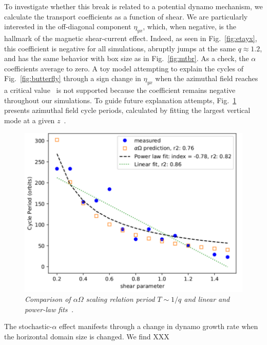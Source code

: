 \documentclass{epsconf}
\begin{document}
To investigate whether this break is related to a potential dynamo mechanism, we calculate the transport coefficients as a function of shear. We are particularly interested in the off-diagonal component $\eta_{yx}$, which, when negative, is the hallmark of the magnetic shear-current effect. Indeed, as seen in Fig.~\ref{fig:etayx}, this coefficient is negative for all simulations, abruptly jumps at the same $q\approx1.2$, and has the same behavior with box size as in Fig.~\ref{fig:mtbr}. As a check, the $\alpha$ coefficients average to zero. A toy model attempting to explain the cycles of Fig.~\ref{fig:butterfly} through a sign change in $\eta_{yx}$ when the azimuthal field reaches a critical value~\cite{LesurOgilvie08} is not supported because the coefficient remains negative throughout our simulations. To guide future explanation attempts, Fig.~\ref{fig:qperiod} presents azimuthal field cycle periods, calculated by fitting the largest vertical mode at a given $z$~\cite{SSH16}. 
\begin{figure}
\begin{center} \vspace{-1cm}
\includegraphics[width=\linewidth]{fig_q_cycle_period_hgbLAIF_r64z4b4000znf.pdf}
\caption{\it \small Comparison of $\alpha\Omega$ scaling relation period $T\sim 1/q$ and linear and power-law fits~\cite{GP15}.}
\label{fig:qperiod}
\vspace{-1cm}
\end{center}
\end{figure}
The stochastic-$\alpha$ effect manifests through a change in dynamo growth rate when the horizontal domain size is changed. We find XXX
\end{document}
